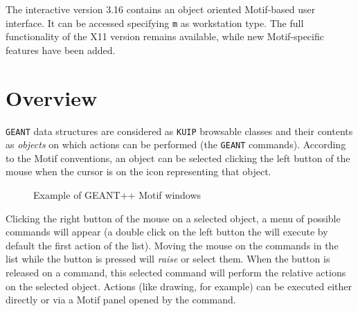    
   

The interactive version 3.16 contains an object oriented Motif-based user
interface. It can be accessed specifying {\tt m} as workstation type.
The full functionality of the X11 version remains available, while new 
Motif-specific features have been added.

\section{Overview}

{\tt GEANT} data structures are considered as {\tt KUIP} browsable 
classes and their
contents as {\it objects} on which actions can be performed (the 
{\tt GEANT} commands).
According to the Motif conventions, an object can be selected clicking the
left button of the mouse when the cursor is on the icon representing that
object. 

\begin{figure}[hbt]
\centering
\hspace*{-1.5cm}
\epsfysize=10cm
\label{draw510-1}
\caption{Example of GEANT++ Motif windows}
\end{figure}

Clicking the right button of the mouse on a selected object, 
a menu of possible
commands will appear (a double click on the left button the will execute
by default the first action of the list). 
Moving the mouse on the commands in the list while the button is pressed
will {\it raise} or select them. When the button is released on a command,
this selected command will perform the relative actions
on the selected object. Actions (like drawing, for example) can be
executed either directly or via a Motif panel opened by the command.

